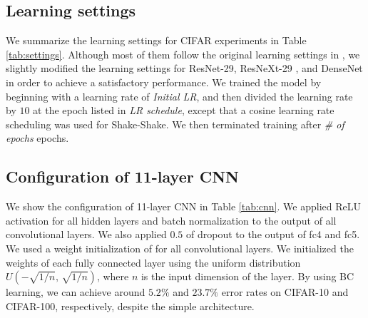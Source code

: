 \documentclass[10pt,twocolumn,letterpaper]{article}
\begin{document}
\subsection{Learning settings}
We summarize the learning settings for CIFAR experiments in Table \ref{tab:settings}. Although most of them follow the original learning settings in \cite{xie2017aggregated, huang2017densely, gastaldi2017shake}, we slightly modified the learning settings for ResNet-29, ResNeXt-29 \cite{xie2017aggregated}, and DenseNet \cite{huang2017densely} in order to achieve a satisfactory performance. We trained the model by beginning
with a learning rate of {\it Initial LR}, and then divided the learning rate by $10$ at the epoch listed in {\it LR
schedule}, except that a cosine learning rate scheduling was used for Shake-Shake. We then terminated training after {\it \# of epochs} epochs.


\subsection{Configuration of 11-layer CNN}
We show the configuration of 11-layer CNN in Table \ref{tab:cnn}. We applied ReLU activation for all hidden layers and batch normalization \cite{ioffe2015batch} to the output of all convolutional layers. We also applied $0.5$ of dropout \cite{srivastava2014dropout} to the output of fc4 and fc5. We used a weight initialization of \cite{he2015delving} for all convolutional layers. We initialized the weights of each fully connected layer using the uniform distribution $U(-\sqrt{1/n},\, \sqrt{1/n}) $, where $n$ is the input dimension of the layer.
By using BC learning, we can achieve around $5.2\%$ and $23.7\%$ error rates on CIFAR-10 and CIFAR-100, respectively, despite the simple architecture.
\end{document}
